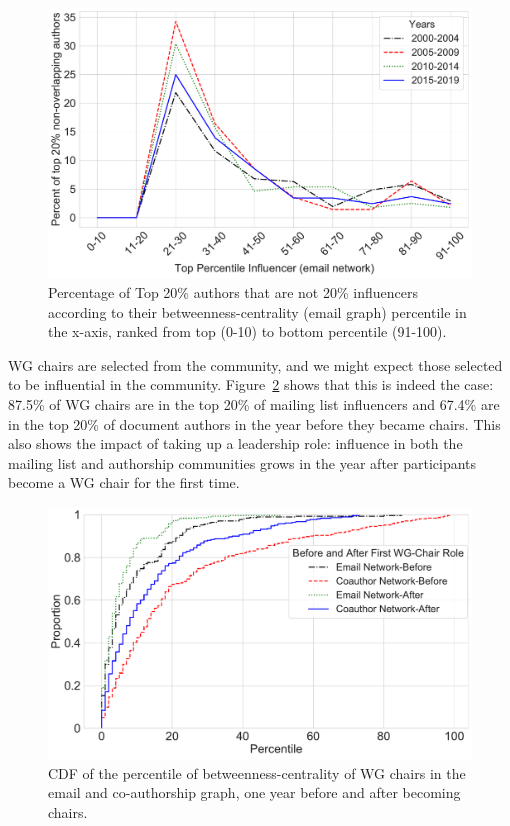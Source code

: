 \documentclass[twocolumn,10pt]{article}
\newlength{\figureWidthOneColumn}
\newcommand{\pb}[1]{\vspace{0.75ex}\noindent{\textbf{#1}}}
\begin{document}
\begin{figure}
  \centering
  \includegraphics[width=\figureWidthOneColumn]{figures-prev/icwsm-2022/coauthor_affiliation_network/lineplot_non_overlapping_authors_emailnetwork_percentile.pdf}
  \caption{
    Percentage of Top 20\% authors that are not 20\% influencers according
    to their betweenness-centrality (email graph) percentile in the x-axis,
    ranked from  top (0-10) to bottom percentile (91-100).
  }
  \label{fig:non_overlapping_coauthornetwork_authors_emailnetwork}
\end{figure}

\pb{Leadership roles} 
WG chairs are selected from the community, and we might expect those
selected to be influential in the community.
Figure~\ref{fig:wg_chair_before_after} shows that this is indeed the case:
87.5\% of WG chairs are in the top 20\% of mailing list influencers and
67.4\% are in the top 20\% of document authors in the year before they
became chairs. This also shows the impact of taking up a leadership role:
influence in both the mailing list and authorship communities grows in the
year after participants become a WG chair for the first time. 


\begin{figure}
  \centering
  \includegraphics[width=\figureWidthOneColumn]{figures-prev/icwsm-2022/WG_chair_percentile_CDF_before_after.pdf}
  \caption{
    CDF of the percentile of betweenness-centrality of WG chairs in the
    email and co-authorship graph, one year before and after becoming
    chairs.
  }
  \label{fig:wg_chair_before_after}
\end{figure}
\end{document}

